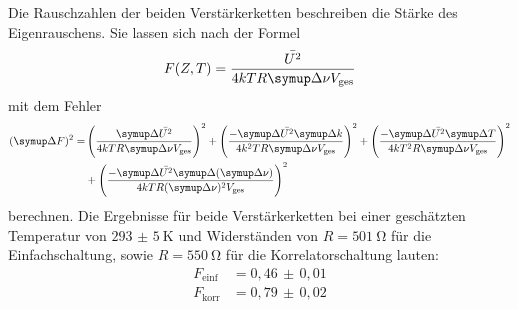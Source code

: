Die Rauschzahlen der beiden Verstärkerketten beschreiben die Stärke des Eigenrauschens. Sie lassen sich nach der Formel
%
\begin{equation}
  F(Z,T)=\frac{\bar{U^2}}{4kTR\upD\nu V_\text{ges}}
\end{equation}
%
mit dem Fehler
%
\begin{align*}
  (\upD F)^2=&\left(\frac{\upD \bar{U^2}}{4kTR\upD\nu V_\text{ges}}\right)^2+\left(\frac{-\upD \bar{U^2}\upD k}{4k^2TR\upD\nu V_\text{ges}}\right)^2+\left(\frac{-\upD \bar{U^2}\upD T}{4kT^2R\upD\nu V_\text{ges}}\right)^2 \\
  &+\left(\frac{-\upD \bar{U^2}\upD(\upD\nu)}{4kTR(\upD\nu)^2 V_\text{ges}}\right)^2
\end{align*}
%
berechnen. Die Ergebnisse für beide Verstärkerketten bei einer geschätzten Temperatur von $\SI{293(5)}{\kelvin}$ und Widerständen von $R=\SI{501}{\ohm}$ für die Einfachschaltung, sowie $R=\SI{550}{\ohm}$ für die Korrelatorschaltung lauten:
%
\begin{align*}
  F_\text{einf}&=0,46\,\pm\,0,01 \\
  F_\text{korr}&=0,79\,\pm\,0,02
\end{align*}
